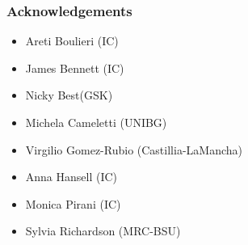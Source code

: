 \documentclass[slidestop,compress,serif,10pt]{beamer}
\begin{document}
\begin{frame}
\frametitle{Acknowledgements}
\begin{itemize}
\vspace{10pt}\item Areti Boulieri (IC)
\vspace{10pt}\item James Bennett (IC)
\vspace{10pt}\item Nicky Best(GSK)
\vspace{10pt}\item Michela Cameletti (UNIBG)
\vspace{10pt}\item Virgilio Gomez-Rubio (Castillia-LaMancha)
\vspace{10pt}\item Anna Hansell (IC)
\vspace{10pt}\item Monica Pirani (IC)
\vspace{10pt}\item Sylvia Richardson (MRC-BSU)
\end{itemize}
\end{frame}
\end{document}
